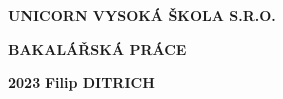 \pagestyle{empty}
\begin{center}
{\Large\bfseries\MakeUppercase{Unicorn Vysoká škola s.r.o.}}
    \vfill

    {\Huge\bfseries\MakeUppercase{Bakalářská práce}} \\

    \vfill

    \noindent\begin{minipage}{\textwidth}
                 \begin{Large}
                     \textbf{2023} \hfill \textbf{Filip \MakeUppercase{Ditrich}}
                 \end{Large}
    \end{minipage}
\end{center}

